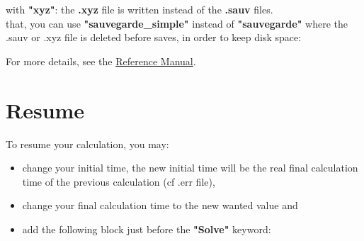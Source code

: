 with
\textbf{"xyz"}: the \textbf{.xyz} file is written instead of the \textbf{.sauv} files.\\

\Note that, you can use \textbf{"sauvegarde\_simple"} instead of \textbf{"sauvegarde"} where the .sauv or .xyz file is deleted before saves, in order to keep disk space:
\begin{center}
\end{center}

For more details, see the \href{\REFERENCEMANUAL\#Pbbase}{\trustref Reference Manual}. \\




\section{Resume}

To resume your calculation, you may:
\begin{itemize}
\item change your initial time, the new initial time will be the real final calculation time of the previous calculation (cf .err file),
\item change your final calculation time to the new wanted value and
\item add the following block just before the \textbf{"Solve"} keyword:
    \begin{center}
    \end{center}
\end{itemize}
\vspace{0.5cm}

